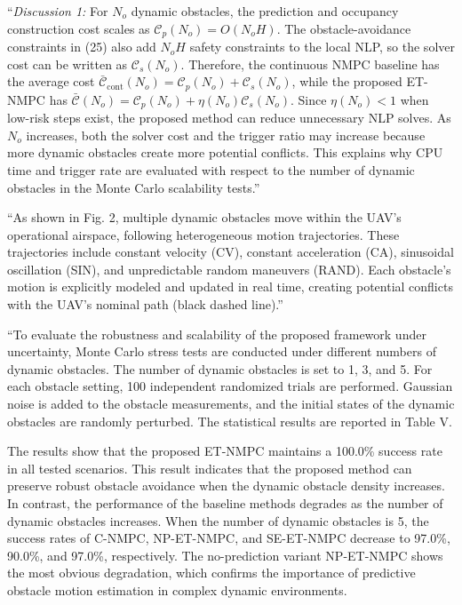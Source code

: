 \documentclass[12pt, twosides]{article}
\theoremstyle{definition}
\begin{document}
``\textit{Discussion 1:}
For $N_o$ dynamic obstacles, the prediction and occupancy construction cost scales as $\mathcal{C}_{p}(N_o)=O(N_oH)$. The obstacle-avoidance constraints in (25) also add $N_oH$ safety constraints to the local NLP, so the solver cost can be written as $\mathcal{C}_{s}(N_o)$. Therefore, the continuous NMPC baseline has the average cost $\bar{\mathcal{C}}_{\mathrm{cont}}(N_o)=\mathcal{C}_{p}(N_o)+\mathcal{C}_{s}(N_o)$, while the proposed ET-NMPC has $\bar{\mathcal{C}}(N_o)=\mathcal{C}_{p}(N_o)+\eta(N_o)\mathcal{C}_{s}(N_o)$. Since $\eta(N_o)<1$ when low-risk steps exist, the proposed method can reduce unnecessary NLP solves. As $N_o$ increases, both the solver cost and the trigger ratio may increase because more dynamic obstacles create more potential conflicts. This explains why CPU time and trigger rate are evaluated with respect to the number of dynamic obstacles in the Monte Carlo scalability tests.''

``As shown in Fig. 2, multiple dynamic obstacles move within the UAV's operational airspace, following heterogeneous motion trajectories. These trajectories include constant velocity (CV), constant acceleration (CA), sinusoidal oscillation (SIN), and unpredictable random maneuvers (RAND). Each obstacle's motion is explicitly modeled and updated in real time, creating potential conflicts with the UAV's nominal path (black dashed line).''

``To evaluate the robustness and scalability of the proposed framework under uncertainty, Monte Carlo stress tests are conducted under different numbers of dynamic obstacles. The number of dynamic obstacles is set to 1, 3, and 5. For each obstacle setting, 100 independent randomized trials are performed. Gaussian noise is added to the obstacle measurements, and the initial states of the dynamic obstacles are randomly perturbed. The statistical results are reported in Table V.

The results show that the proposed ET-NMPC maintains a 100.0\% success rate in all tested scenarios. This result indicates that the proposed method can preserve robust obstacle avoidance when the dynamic obstacle density increases. In contrast, the performance of the baseline methods degrades as the number of dynamic obstacles increases. When the number of dynamic obstacles is 5, the success rates of C-NMPC, NP-ET-NMPC, and SE-ET-NMPC decrease to 97.0\%, 90.0\%, and 97.0\%, respectively. The no-prediction variant NP-ET-NMPC shows the most obvious degradation, which confirms the importance of predictive obstacle motion estimation in complex dynamic environments.
\end{document}
